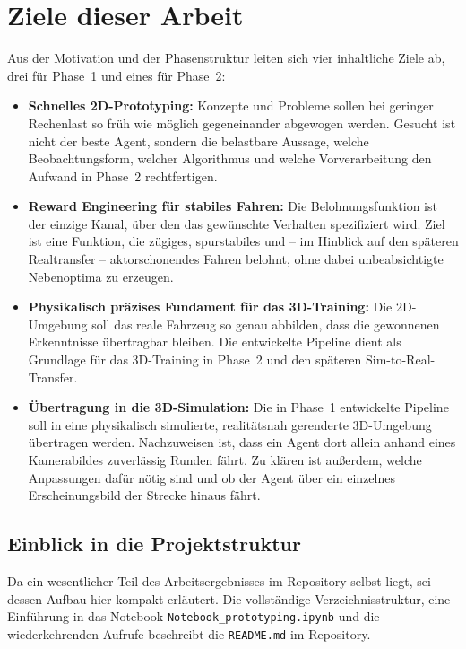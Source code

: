 \section{Ziele dieser Arbeit}
\label{sec:ziele}

Aus der Motivation und der Phasenstruktur leiten sich vier inhaltliche Ziele ab, drei für Phase~1 und eines für Phase~2:

\begin{itemize}
  \item \textbf{Schnelles 2D-Prototyping:} Konzepte und Probleme sollen bei geringer Rechenlast so früh wie möglich gegeneinander abgewogen werden. Gesucht ist nicht der beste Agent, sondern die belastbare Aussage, welche Beobachtungsform, welcher Algorithmus und welche Vorverarbeitung den Aufwand in Phase~2 rechtfertigen.
  \item \textbf{Reward Engineering für stabiles Fahren:} Die Belohnungsfunktion ist der einzige Kanal, über den das gewünschte Verhalten spezifiziert wird. Ziel ist eine Funktion, die zügiges, spurstabiles und -- im Hinblick auf den späteren Realtransfer -- aktorschonendes Fahren belohnt, ohne dabei unbeabsichtigte Nebenoptima zu erzeugen.
  \item \textbf{Physikalisch präzises Fundament für das 3D-Training:} Die 2D-Umgebung soll das reale Fahrzeug so genau abbilden, dass die gewonnenen Erkenntnisse übertragbar bleiben. Die entwickelte Pipeline dient als Grundlage für das 3D-Training in Phase~2 und den späteren Sim-to-Real-Transfer.
  \item \textbf{Übertragung in die 3D-Simulation:} Die in Phase~1 entwickelte Pipeline soll in eine physikalisch simulierte, realitätsnah gerenderte 3D-Umgebung übertragen werden. Nachzuweisen ist, dass ein Agent dort allein anhand eines Kamerabildes zuverlässig Runden fährt. Zu klären ist außerdem, welche Anpassungen dafür nötig sind und ob der Agent über ein einzelnes Erscheinungsbild der Strecke hinaus fährt.
\end{itemize}

\subsection{Einblick in die Projektstruktur}
\label{subsec:projektaufbau}

Da ein wesentlicher Teil des Arbeitsergebnisses im Repository selbst liegt, sei dessen Aufbau hier kompakt erläutert. Die vollständige Verzeichnisstruktur, eine Einführung in das Notebook \texttt{Notebook\_prototyping.ipynb} und die wiederkehrenden Aufrufe beschreibt die \texttt{README.md} im Repository.

